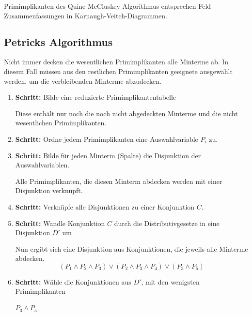 \documentclass[12pt]{report}
\begin{document}
\begin{infobox}
  Primimplikanten des Quine-McCluskey-Algorithmus entsprechen 
  Feld-Zusammenfassungen in Karnaugh-Veitch-Diagrammen.
\end{infobox}

\pagebreak
\subsection{Petricks Algorithmus}
Nicht immer decken die wesentlichen Primimplikanten alle Minterme ab. 
In diesem Fall müssen aus den restlichen Primimplikanten geeignete ausgewählt werden, 
um die verbleibenden Minterme abzudecken.


\begin{enumerate}
  \item \textbf{Schritt:} Bilde eine reduzierte Primimplikantentabelle
        
        Diese enthält nur noch die noch nicht abgedeckten Minterme und die nicht wesentlichen Primimplikanten.
        
  \item \textbf{Schritt:} Ordne jedem Primimplikanten eine Auswahlvariable $P_i$ zu.
        
  \item \textbf{Schritt:} Bilde für jeden Minterm (Spalte) die Disjunktion der Auswahlvariablen.
        
        Alle Primimplikanten, die diesen Minterm abdecken werden mit einer Disjunktion verknüpft.
        
  \item \textbf{Schritt:} Verknüpfe alle Disjunktionen zu einer Konjunktion $C$.
        
  \item \textbf{Schritt:} Wandle Konjunktion $C$ durch die Distributivgesetze in eine Disjunktion $D'$ um
        
        Nun ergibt sich eine Disjunktion aus Konjunktionen, die jeweils alle Minterme abdecken.
        $$(P_1 \wedge P_2 \wedge P_3) \vee (P_2 \wedge P_3 \wedge P_4) \vee (P_3 \wedge P_5)$$
        
  \item \textbf{Schritt:} Wähle die Konjunktionen aus $D'$, mit den wenigsten Primimplikanten
        
        $P_3 \wedge P_5$
        
\end{enumerate}
\end{document}
